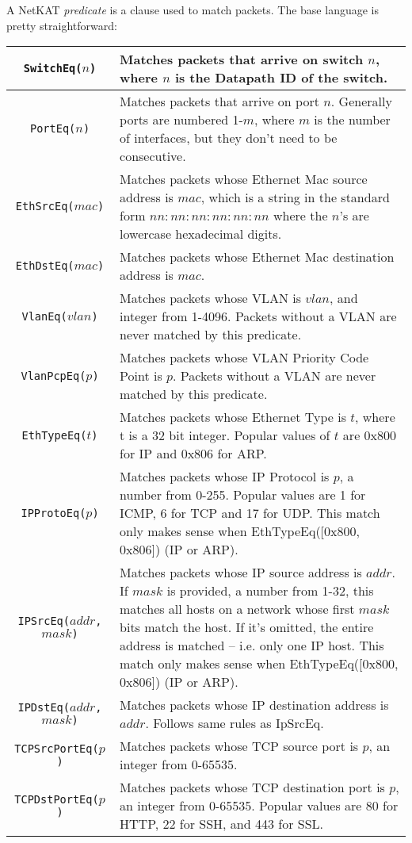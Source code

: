 A NetKAT \textit{predicate} is a clause used to match packets.
The base language is pretty straightforward:

\bigskip
\begin{tabularx}{6in}{|c|X|}
\hline\hline
\texttt{SwitchEq($n$)} & Matches packets that arrive on switch $n$, where $n$ is the Datapath ID of the switch.  
\\ \hline
\texttt{PortEq($n$)} & Matches packets that arrive on port $n$.  Generally ports are numbered 1-$m$, where $m$ is the
number of interfaces, but they don't need to be consecutive.  
\\ \hline
\texttt{EthSrcEq($mac$)} & Matches packets whose Ethernet Mac source address is $mac$, which is a string in the standard form $nn:nn:nn:nn:nn:nn$ where the $n$'s are lowercase hexadecimal digits.
\\ \hline
\texttt{EthDstEq($mac$)} & Matches packets whose Ethernet Mac destination address is $mac$.
\\ \hline
\texttt{VlanEq($vlan$)} & Matches packets whose VLAN is $vlan$, and integer from 1-4096.  Packets without a VLAN are never matched by this predicate.
\\ \hline
\texttt{VlanPcpEq($p$)} & Matches packets whose VLAN Priority Code Point is $p$.  Packets without a VLAN are never matched by this predicate.
\\ \hline
\texttt{EthTypeEq($t$)} & Matches packets whose Ethernet Type is $t$, where t is a 32 bit integer.  Popular values of $t$ are 0x800 for IP and 0x806 for ARP.  
\\ \hline
\texttt{IPProtoEq($p$)} & Matches packets whose IP Protocol is $p$, a number from 0-255.  
Popular values are 1 for ICMP, 6 for TCP and 17 for UDP.  
This match only makes sense when EthTypeEq([0x800, 0x806]) (IP or ARP). 
\\ \hline
\texttt{IPSrcEq($addr$, $mask$)} & Matches packets whose IP source address is $addr$.  
If $mask$ is provided, a number from 1-32, this matches all hosts on a network whose first $mask$ bits match the host.
If it's omitted, the entire address is matched -- i.e. only one IP host.  
This match only makes sense when EthTypeEq([0x800, 0x806]) (IP or ARP). 
\\ \hline
\texttt{IPDstEq($addr$, $mask$)} & Matches packets whose IP destination address is $addr$.  
Follows same rules as IpSrcEq.
\\ \hline
\texttt{TCPSrcPortEq($p$)} & Matches packets whose TCP source port is $p$, an integer from 0-65535.
\\ \hline
\texttt{TCPDstPortEq($p$)} & Matches packets whose TCP destination port is $p$, an integer from 0-65535.
Popular values are 80 for HTTP, 22 for SSH, and 443 for SSL.  
\\ \hline\hline
\end{tabularx}

